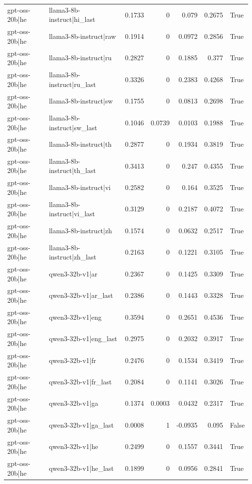 \begin{table}
\begin{tabular}{l l r r r r l}
gpt-oss-20b|he & llama3-8b-instruct|hi_last & 0.1733 & 0 & 0.079 & 0.2675 & True \\
gpt-oss-20b|he & llama3-8b-instruct|raw & 0.1914 & 0 & 0.0972 & 0.2856 & True \\
gpt-oss-20b|he & llama3-8b-instruct|ru & 0.2827 & 0 & 0.1885 & 0.377 & True \\
gpt-oss-20b|he & llama3-8b-instruct|ru_last & 0.3326 & 0 & 0.2383 & 0.4268 & True \\
gpt-oss-20b|he & llama3-8b-instruct|sw & 0.1755 & 0 & 0.0813 & 0.2698 & True \\
gpt-oss-20b|he & llama3-8b-instruct|sw_last & 0.1046 & 0.0739 & 0.0103 & 0.1988 & True \\
gpt-oss-20b|he & llama3-8b-instruct|th & 0.2877 & 0 & 0.1934 & 0.3819 & True \\
gpt-oss-20b|he & llama3-8b-instruct|th_last & 0.3413 & 0 & 0.247 & 0.4355 & True \\
gpt-oss-20b|he & llama3-8b-instruct|vi & 0.2582 & 0 & 0.164 & 0.3525 & True \\
gpt-oss-20b|he & llama3-8b-instruct|vi_last & 0.3129 & 0 & 0.2187 & 0.4072 & True \\
gpt-oss-20b|he & llama3-8b-instruct|zh & 0.1574 & 0 & 0.0632 & 0.2517 & True \\
gpt-oss-20b|he & llama3-8b-instruct|zh_last & 0.2163 & 0 & 0.1221 & 0.3105 & True \\
gpt-oss-20b|he & qwen3-32b-v1|ar & 0.2367 & 0 & 0.1425 & 0.3309 & True \\
gpt-oss-20b|he & qwen3-32b-v1|ar_last & 0.2386 & 0 & 0.1443 & 0.3328 & True \\
gpt-oss-20b|he & qwen3-32b-v1|eng & 0.3594 & 0 & 0.2651 & 0.4536 & True \\
gpt-oss-20b|he & qwen3-32b-v1|eng_last & 0.2975 & 0 & 0.2032 & 0.3917 & True \\
gpt-oss-20b|he & qwen3-32b-v1|fr & 0.2476 & 0 & 0.1534 & 0.3419 & True \\
gpt-oss-20b|he & qwen3-32b-v1|fr_last & 0.2084 & 0 & 0.1141 & 0.3026 & True \\
gpt-oss-20b|he & qwen3-32b-v1|ga & 0.1374 & 0.0003 & 0.0432 & 0.2317 & True \\
gpt-oss-20b|he & qwen3-32b-v1|ga_last & 0.0008 & 1 & -0.0935 & 0.095 & False \\
gpt-oss-20b|he & qwen3-32b-v1|he & 0.2499 & 0 & 0.1557 & 0.3441 & True \\
gpt-oss-20b|he & qwen3-32b-v1|he_last & 0.1899 & 0 & 0.0956 & 0.2841 & True \\

\end{tabular}
\end{table}
